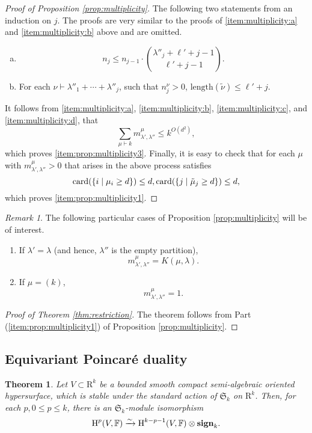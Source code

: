 \documentclass{amsart}
\newtheorem{theorem}{Theorem}
\theoremstyle{definition}
\theoremstyle{remark}
\newtheorem{remark}{Remark}
\numberwithin{equation}{section}
\begin{document}
\begin{proof}[Proof of Proposition \ref{prop:multiplicity}]
The following two statements from an induction on $j$. The proofs are very similar to the proofs
of \eqref{item:multiplicity:a} and \eqref{item:multiplicity:b} above and are omitted.

\begin{enumerate}[(a)]
\addtocounter{enumi}{2}
\item
\label{item:multiplicity:c}
\[
n_j \leq n_{j-1} \cdot \binom{\lambda''_j+\ell'+j-1}{\ell'+j-1}.
\]
\item
\label{item:multiplicity:d}
For each $\nu \vdash \lambda''_1 + \cdots +\lambda''_{j}$, such that
$n^\nu_j > 0$, ${\mathrm{length}}(\widetilde{\nu}) \leq \ell'+j$.
\end{enumerate}

It follows from \eqref{item:multiplicity:a}, \eqref{item:multiplicity:b}, \eqref{item:multiplicity:c}, and \eqref{item:multiplicity:d}, that
\[
\sum_{\mu\vdash k} m^\mu_{\lambda',\lambda''} \leq k^{O(d^2)},
\]
which proves \eqref{item:prop:multiplicity3}.
Finally, it is easy to check that for each $\mu$ with $m^{\mu}_{\lambda',\lambda''} > 0$
that arises in the above process satisfies
\[
{\mathrm{card}}(\{ i \mid \mu_i \geq d \}) \leq d, \\
{\mathrm{card}}(\{j \mid \tilde{\mu}_j \geq d\}) \leq d,
\]
which proves \eqref{item:prop:multiplicity1}.
\end{proof} 

\begin{remark}
\label{rem:multiplicity}
The following particular cases of Proposition \ref{prop:multiplicity} will be of interest.
\begin{enumerate}
\item
If $\lambda' = \lambda$ (and hence, $\lambda''$ is the empty partition),
\[m^\mu_{\lambda',\lambda''} = K(\mu,\lambda).
\]
\item
If $\mu=(k)$, 
\[m^\mu_{\lambda',\lambda''} = 1.
\]
\end{enumerate}
\end{remark}

\begin{proof}[Proof of Theorem \ref{thm:restriction}]
The theorem follows from Part (\ref{item:prop:multiplicity1}) of Proposition \ref{prop:multiplicity}.
\end{proof}

\subsection{Equivariant Poincar\'e duality}
\label{subsec:Poincare-duality}
\begin{theorem}
\label{thm:poincare-duality}
Let $V \subset {\mathrm{R}}^k$ be a bounded smooth compact semi-algebraic oriented hypersurface, which is 
stable under the standard action of $\mathfrak{S}_k$ on ${\mathrm{R}}^k$. Then, for each $p,0 \leq p \leq k$,
there is an $\mathfrak{S}_k$-module isomorphism
\[
{\mbox{\rm H}}^p(V,{\mathbb{F}}) \xrightarrow{\sim} {\mbox{\rm H}}^{k-p-1}(V,{\mathbb{F}}) \otimes 
\mathbf{sign}_k.
\] 
\end{theorem}
\end{document}
